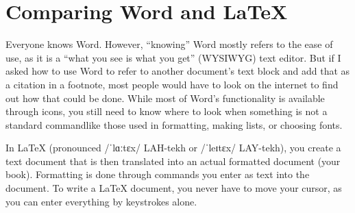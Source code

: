


\chapter{Comparing Word and LaTeX}
\label{differencebetweenwordandlatex:cha}

Everyone knows Word. However, ``knowing'' Word mostly refers to the ease of use, as it is a ``what you see is what you get'' (WYSIWYG) text editor. But if I asked how to use Word to refer to another document's text block and add that as a citation in a footnote, most people would have to look on the internet to find out how that could be done. While most of Word's functionality is available through icons, you still need to know where to look when something is not a standard command\emdash{}like those used in formatting, making lists, or choosing fonts.



In LaTeX (pronounced \ifxetex/ˈlɑːtɛx/\fi{} LAH-tekh or \ifxetex/ˈleɪtɛx/\fi{} LAY-tekh), you create a text document that is then translated into an actual formatted document (your book). Formatting is done through commands you enter as text into the document. To write a LaTeX document, you never have to move your cursor, as you can enter everything by keystrokes alone.

